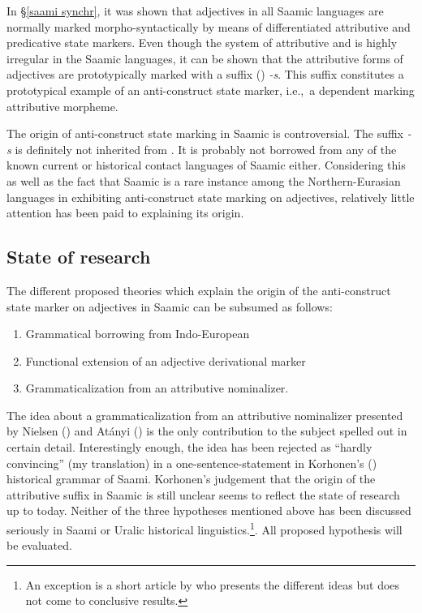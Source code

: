 {In \S\ref{saami synchr}, it was shown that adjectives in all Saamic languages are normally marked morpho-syntactically by means of differentiated attributive and predicative state markers. Even though the system of attributive and  is highly irregular in the Saamic languages, it can be shown that the attributive forms of adjectives are prototypically marked with a suffix () \textit{-s}. This suffix constitutes a prototypical example of an anti\hyp{}construct state marker, i.e.,~a dependent marking attributive morpheme.

The origin of anti\hyp{}construct state marking in Saamic is controversial. The suffix \textit{-s} is definitely not inherited from . It is probably not borrowed from any of the known current or historical contact languages of Saamic either. Considering this as well as the fact that Saamic is a rare instance among the Northern-Eurasian languages in exhibiting anti\hyp{}construct state marking on adjectives, relatively little attention has been paid to explaining its origin.

\subsection{State of research}
The different proposed theories which explain the origin of the anti\hyp{}construct state marker on adjectives in Saamic can be subsumed as follows:
\begin{enumerate}
\item Grammatical borrowing from Indo-European
\item Functional extension of an adjective derivational marker
\item Grammaticalization from an attributive nominalizer.
\end{enumerate}
The idea about a grammaticalization from an attributive nominalizer presented by Nielsen (\citeyear{nielsen1933}) and Atányi (\citeyear{atanyi1942,atanyi1943}) is the only contribution to the subject spelled out in certain detail. Interestingly enough, the idea has been rejected as “hardly convincing” (my translation) in a one-sentence-statement in Korhonen's (\citeyear{korhonen-m1981}) historical grammar of Saami. Korhonen's judgement that the origin of the attributive suffix in Saamic is still unclear \cite[246]{korhonen-m1981} seems to reflect the state of research up to today. Neither of the three hypotheses mentioned above has been discussed seriously in Saami or Uralic historical linguistics.\footnote{An exception is a short article by \cite{sarv-m2001} who presents the different ideas but does not come to conclusive results.}. All proposed hypothesis will be evaluated.

}
